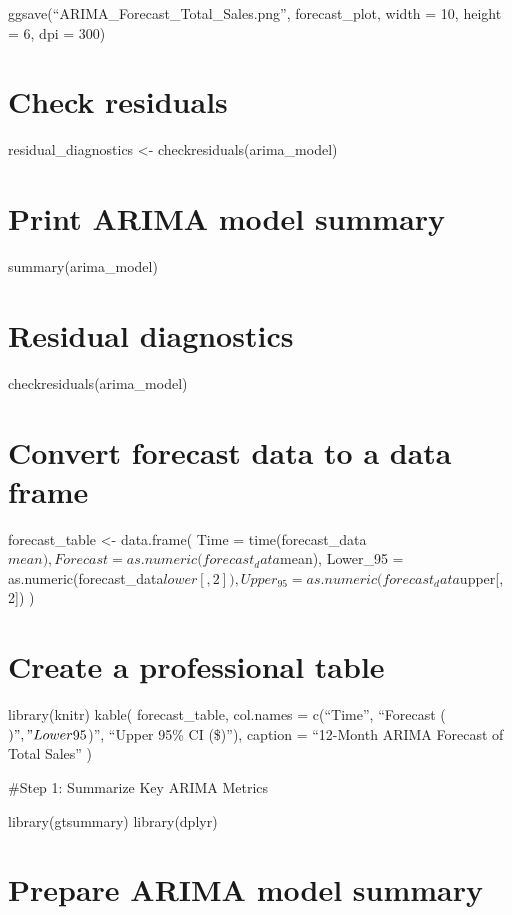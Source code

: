 \documentclass[
]{article}
\begin{document}
ggsave(``ARIMA\_Forecast\_Total\_Sales.png'', forecast\_plot, width =
10, height = 6, dpi = 300)

\section{Check residuals}\label{check-residuals-1}

residual\_diagnostics \textless- checkresiduals(arima\_model)

\section{Print ARIMA model summary}\label{print-arima-model-summary}

summary(arima\_model)

\section{Residual diagnostics}\label{residual-diagnostics}

checkresiduals(arima\_model)

\section{Convert forecast data to a data
frame}\label{convert-forecast-data-to-a-data-frame}

forecast\_table \textless- data.frame( Time =
time(forecast\_data\(mean),
  Forecast = as.numeric(forecast_data\)mean), Lower\_95 =
as.numeric(forecast\_data\(lower[, 2]),
  Upper_95 = as.numeric(forecast_data\)upper{[}, 2{]}) )

\section{Create a professional table}\label{create-a-professional-table}

library(knitr) kable( forecast\_table, col.names = c(``Time'',
``Forecast (\()", "Lower 95%
\))'', ``Upper 95\% CI (\$)''), caption = ``12-Month ARIMA Forecast of
Total Sales'' )

\#Step 1: Summarize Key ARIMA Metrics

library(gtsummary) library(dplyr)

\section{Prepare ARIMA model summary}\label{prepare-arima-model-summary}
\end{document}
